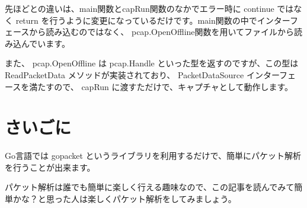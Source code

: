 先ほどとの違いは、main関数とcapRun関数のなかでエラー時に continue ではなく return を行うように変更になっているだけです。main関数の中でインターフェースから読み込むのではなく、 pcap.OpenOffline関数を用いてファイルから読み込んでいます。

また、 pcap.OpenOffline は pcap.Handle といった型を返すのですが、この型は ReadPacketData メソッドが実装されており、 PacketDataSource インターフェースを満たすので、 capRun に渡すただけで、キャプチャとして動作します。


\section{さいごに}
Go言語では gopacket というライブラリを利用するだけで、簡単にパケット解析を行うことが出来ます。

パケット解析は誰でも簡単に楽しく行える趣味なので、この記事を読んでみて簡単かな？と思った人は楽しくパケット解析をしてみましょう。

